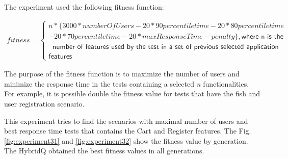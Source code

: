 The experiment used the following fitness function:

\begin{equation}
\begin{aligned}
fitness=\begin{cases} n*\{3000*numberOfUsers-20* 90percentiletime-20*80percentiletime\\-20*70percentiletime
-20*maxResponseTime-penalty\} , \textsf{where n is the }\\\ \textsf{ number of features used by the test in a set of previous selected application} \\ \textsf{features}
\end{cases}
\end{aligned}
\end{equation}


The purpose of the fitness function is to maximize the number of users and minimize the response time in the tests containing a selected \textit{n} functionalities. For example, it is possible double the fitness value for tests that have the fish and user registration scenario. 

This experiment tries to find the scenarios with maximal number of users and best response time tests that contains the Cart and Register features. The Fig. \ref{fig:experiment31} and \ref{fig:experiment32} show the fitness value by generation. The HybridQ obtained the best fitness values in all generations.


